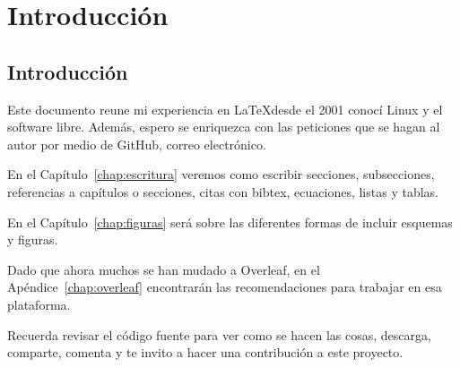 \chapter{Introducción}
\label{chap:introduccion}

 
 
 \section{Introducción}


Este documento reune mi experiencia en \LaTeX desde el 2001 conocí Linux y el software libre. Además, espero se enriquezca con las peticiones que se hagan al autor por medio de GitHub, correo electrónico.

En el Capítulo~\ref{chap:escritura} veremos como escribir secciones, subsecciones,  referencias a capítulos o secciones, citas con bibtex, ecuaciones, listas y tablas.

En el Capítulo~\ref{chap:figuras} será sobre las diferentes formas de incluir esquemas y figuras.

Dado que ahora muchos se han mudado a Overleaf, en el Apéndice~\ref{chap:overleaf} encontrarán las recomendaciones para trabajar en esa plataforma.


Recuerda revisar el código fuente para ver  como se hacen las cosas, descarga, comparte, comenta y te invito a hacer una contribución a este proyecto.
